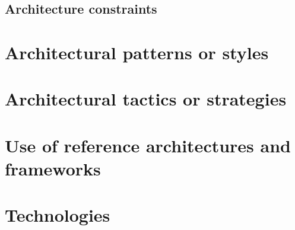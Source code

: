 \documentclass[a4paper,12pt]{report}
\begin{document}
\subsection{Architecture constraints}
	
\section{Architectural patterns or styles}
	
\section{Architectural tactics or strategies}
	
\section{Use of reference architectures and frameworks}
	
\section{Technologies}
	
\begin{thebibliography}{9}

  	
\end{thebibliography}
\end{document}
